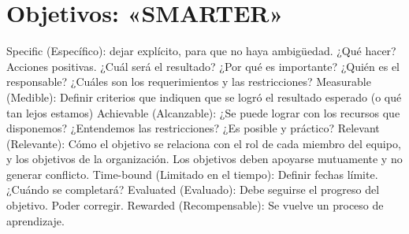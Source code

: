 \section{Objetivos: «SMARTER»}
\begin{description}
Specific (Específico): dejar explícito, para que no haya ambigüedad.
	¿Qué hacer? Acciones positivas.
	¿Cuál será el resultado?
	¿Por qué es importante?
	¿Quién es el responsable?
	¿Cuáles son los requerimientos y las restricciones?
Measurable (Medible): 
	Definir criterios que indiquen que se logró el resultado esperado (o qué tan lejos estamos)
Achievable (Alcanzable):
	¿Se puede lograr con los recursos que disponemos?
	¿Entendemos las restricciones?
	¿Es posible y práctico?
Relevant (Relevante):
	Cómo el objetivo se relaciona con el rol de cada miembro del equipo, y los objetivos de la organización.
	Los objetivos deben apoyarse mutuamente y no generar conflicto.
Time-bound (Limitado en el tiempo):
	Definir fechas límite.
	¿Cuándo se completará?
Evaluated (Evaluado):
	Debe seguirse el progreso del objetivo.
	Poder corregir.
Rewarded (Recompensable):
	Se vuelve un proceso de aprendizaje.
\end{description}
